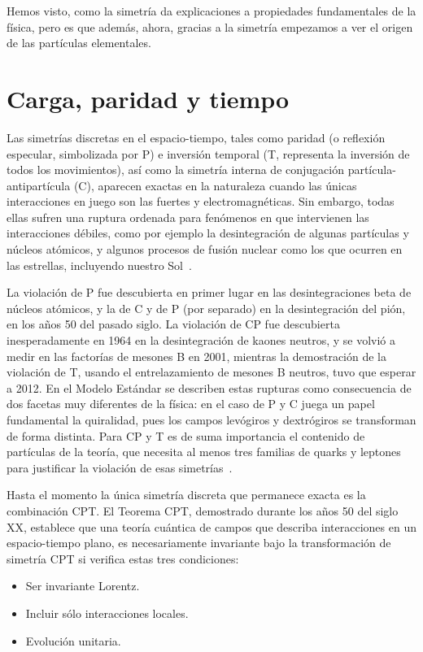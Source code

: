 Hemos visto, como la simetría da explicaciones a propiedades fundamentales de la física, pero es que además, ahora, gracias a la simetría empezamos a ver el origen de las partículas elementales.

\section{Carga, paridad y tiempo}\label{sec:paridad-carga-y-tiempo}

Las simetrías discretas en el espacio-tiempo, tales como paridad (o reflexión especular, simbolizada por P) e inversión temporal (T, representa la inversión de todos los movimientos), así como la simetría interna de conjugación partícula-antipartícula (C), aparecen exactas en la naturaleza cuando las únicas interacciones en juego son las fuertes y electromagnéticas. Sin embargo, todas ellas sufren una ruptura ordenada para fenómenos en que intervienen las interacciones débiles, como por ejemplo la desintegración de algunas partículas y núcleos atómicos, y algunos procesos de fusión nuclear como los que ocurren en las estrellas, incluyendo nuestro Sol~\autocite{IFIC}.

La violación de P fue descubierta en primer lugar en las desintegraciones beta de núcleos atómicos, y la de C y de P (por separado) en la desintegración del pión, en los años 50 del pasado siglo. La violación de CP fue descubierta inesperadamente en 1964 en la desintegración de kaones neutros, y se volvió a medir en las factorías de mesones B en 2001, mientras la demostración de la violación de T, usando el entrelazamiento de mesones B neutros, tuvo que esperar a 2012. En el Modelo Estándar se describen estas rupturas como consecuencia de dos facetas muy diferentes de la física: en el caso de P y C juega un papel fundamental la quiralidad, pues los campos levógiros y dextrógiros se transforman de forma distinta. Para CP y T es de suma importancia el contenido de partículas de la teoría, que necesita al menos tres familias de quarks y leptones para justificar la violación de esas simetrías~\autocite{IFIC}.

Hasta el momento la única simetría discreta que permanece exacta es la combinación CPT. El Teorema CPT, demostrado durante los años 50 del siglo XX, establece que una teoría cuántica de campos que describa interacciones en un espacio-tiempo plano, es necesariamente invariante bajo la transformación de simetría CPT si verifica estas tres condiciones:
\begin{itemize}
	\item Ser invariante Lorentz.
	\item Incluir sólo interacciones locales.
	\item Evolución unitaria.
\end{itemize}
~\autocite{IFIC}

